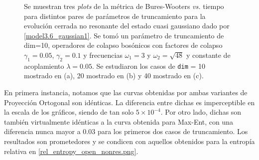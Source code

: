 \documentclass{report} %
\numberwithin{equation}{section}
\begin{document}
\begin{figure}
\caption{Se muestran tres \textit{plots} de la métrica de Bures-Wooters \textit{vs.} tiempo para distintos pares de parámetros de truncamiento para la evolución cerrada no resonante del estado cuasi gaussiano dado por \eqref{model3.6_gaussian1}. Se tomó un parámetro de truncamiento de dim=10, operadores de colapso bosónicos con factores de colapso $\gamma_1 = 0.05$, $\gamma_2 = 0.1$ y frecuencias $\omega_1 = 3$ y $\omega_2 = \sqrt{48}$ y constante de acoplamiento $\lambda = 0.05$. Se estudiaron los casos de \texttt{dim} = 10 mostrado en (a), 20 mostrado en (b) y 40 mostrado en (c). }
\label{bxb-closed-res/bxs_open_nr.png}
\end{figure}

En primera instancia, notamos que las curvas obtenidas por ambas variantes de Proyección Ortogonal son idénticas. La diferencia entre dichas es imperceptible en la escala de los gráficos, siendo de tan solo $5 \times 10^{-4}$. Por otro lado, dichas son también virtualmente idénticas a la curva obtenida para Max-Ent, con una diferencia nunca mayor a $0.03$ para los primeros dos casos de truncamiento. Los resultados son prometedores y se condicen con aquellos obtenidos para la entropía relativa en \ref{rel_entropy_open_nonres.png}.
\end{document}
